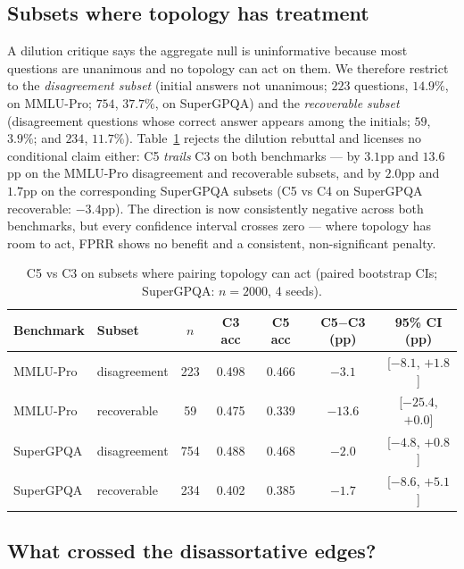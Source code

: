 \documentclass[11pt]{article}
\begin{document}
\subsection{Subsets where topology has treatment}
\label{sec:subsets}

A dilution critique says the aggregate null is uninformative because most questions are unanimous and no topology can act on them. We therefore restrict to the \emph{disagreement subset} (initial answers not unanimous; $223$ questions, $14.9\%$, on MMLU-Pro; $754$, $37.7\%$, on SuperGPQA) and the \emph{recoverable subset} (disagreement questions whose correct answer appears among the initials; $59$, $3.9\%$; and $234$, $11.7\%$). Table~\ref{tab:subsets} rejects the dilution rebuttal and licenses no conditional claim either: C5 \emph{trails} C3 on both benchmarks --- by $3.1$pp and $13.6$pp on the MMLU-Pro disagreement and recoverable subsets, and by $2.0$pp and $1.7$pp on the corresponding SuperGPQA subsets (C5 vs C4 on SuperGPQA recoverable: $-3.4$pp). The direction is now consistently negative across both benchmarks, but every confidence interval crosses zero --- where topology has room to act, FPRR shows no benefit and a consistent, non-significant penalty.

\begin{table}[t]
\centering
\small
\caption{C5 vs C3 on subsets where pairing topology can act (paired bootstrap CIs; SuperGPQA: $n=2000$, 4 seeds).}
\label{tab:subsets}
\begin{tabular}{llccccc}
\toprule
Benchmark & Subset & $n$ & C3 acc & C5 acc & C5$-$C3 (pp) & 95\% CI (pp) \\
\midrule
MMLU-Pro & disagreement & 223 & 0.498 & 0.466 & $-3.1$ & [$-8.1$, $+1.8$] \\
MMLU-Pro & recoverable  & 59  & 0.475 & 0.339 & $-13.6$ & [$-25.4$, $+0.0$] \\
SuperGPQA & disagreement & 754 & 0.488 & 0.468 & $-2.0$ & [$-4.8$, $+0.8$] \\
SuperGPQA & recoverable  & 234 & 0.402 & 0.385 & $-1.7$ & [$-8.6$, $+5.1$] \\
\bottomrule
\end{tabular}
\end{table}

\subsection{What crossed the disassortative edges?}
\label{sec:what}
\end{document}
